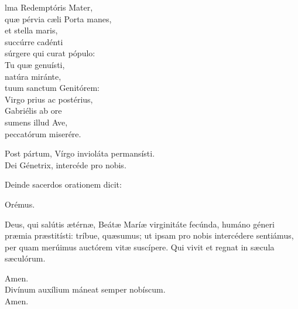 

\begin{changemargin}{3cm}{2cm}

lma Redemptóris Mater,\\
quæ pérvia cæli Porta manes,\\
et stella maris,\\
succúrre cadénti\\
súrgere qui curat pópulo:\\
Tu quæ genuísti,\\
natúra miránte,\\
tuum sanctum Genitórem:\\
Virgo prius ac postérius,\\
Gabriélis ab ore\\
sumens illud Ave,\\
peccatórum miserére.\\

\end{changemargin}

\va Post pártum, Vírgo invioláta permansísti.\\
\ra Dei Génetrix, intercéde pro nobis.

Deinde sacerdos orationem dicit:

Orémus.

Deus, qui salútis ætérnæ, Beátæ Maríæ virginitáte fecúnda, humáno
géneri pr\ae mia præstitísti: tríbue, qu\ae sumus; ut ipsam
pro nobis intercédere sentiámus, per quam merúimus auctórem
vitæ suscípere. Qui vivit et regnat in s\ae cula sæculórum.

\ra Amen.\\
\va Divínum auxílium máneat semper nobíscum.\\
\ra Amen.

